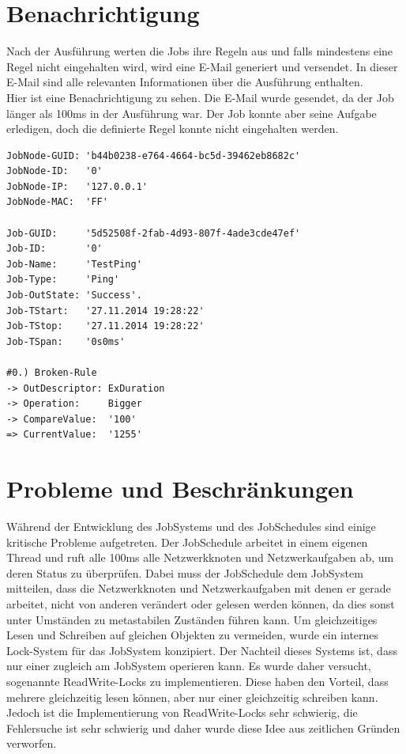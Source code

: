 \documentclass[12pt,a4paper]{report}
\begin{document}
\begin{onehalfspace}
\section{Benachrichtigung}

Nach der Ausführung werten die Jobs ihre Regeln aus und falls mindestens eine Regel nicht eingehalten wird, wird eine E-Mail generiert und versendet. In dieser E-Mail sind alle relevanten Informationen über die Ausführung enthalten.\\ 
Hier ist eine Benachrichtigung zu sehen. Die E-Mail wurde gesendet, da der Job länger als 100ms in der Ausführung war. Der Job konnte aber seine Aufgabe erledigen, doch die definierte Regel konnte nicht eingehalten werden.\\

\begin{lstlisting}
JobNode-GUID: 'b44b0238-e764-4664-bc5d-39462eb8682c'
JobNode-ID:   '0'
JobNode-IP:   '127.0.0.1'
JobNode-MAC:  'FF'

Job-GUID:     '5d52508f-2fab-4d93-807f-4ade3cde47ef'
Job-ID:       '0'
Job-Name:     'TestPing'
Job-Type:     'Ping'
Job-OutState: 'Success'.
Job-TStart:   '27.11.2014 19:28:22'
Job-TStop:    '27.11.2014 19:28:22'
Job-TSpan:    '0s0ms'

#0.) Broken-Rule
-> OutDescriptor: ExDuration
-> Operation:     Bigger
-> CompareValue:  '100'
=> CurrentValue:  '1255'
\end{lstlisting}

\newpage
\section{Probleme und Beschränkungen}

Während der Entwicklung des JobSystems und des JobSchedules sind einige kritische Probleme aufgetreten. Der JobSchedule arbeitet in einem eigenen Thread und ruft alle 100ms alle Netzwerkknoten und Netzwerkaufgaben ab, um deren Status zu überprüfen. Dabei muss der JobSchedule dem JobSystem mitteilen, dass die Netzwerkknoten und Netzwerkaufgaben mit denen er gerade arbeitet, nicht von anderen verändert oder gelesen werden können, da dies sonst unter Umständen zu metastabilen Zuständen führen kann. Um gleichzeitiges Lesen und Schreiben auf gleichen Objekten zu vermeiden, wurde ein internes Lock-System für das JobSystem konzipiert. Der Nachteil dieses Systems ist, dass nur einer zugleich am JobSystem operieren kann. Es wurde daher versucht, sogenannte ReadWrite-Locks zu implementieren. Diese haben den Vorteil, dass mehrere gleichzeitig lesen können, aber nur einer gleichzeitig schreiben kann. Jedoch ist die Implementierung von ReadWrite-Locks sehr schwierig, die Fehlersuche ist sehr schwierig und daher wurde diese Idee aus zeitlichen Gründen verworfen.\\


\end{onehalfspace}
\end{document}
